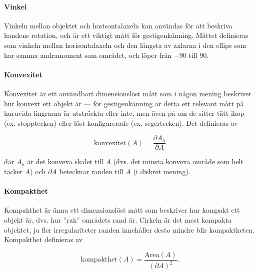 \documentclass[../rapport_MVEX01-11-05]{subfiles}
\begin{document}
\paragraph{Vinkel}
\label{feat:vinkel}

Vinkeln mellan objektet och horisontalaxeln kan användas för att
beskriva handens rotation, och är ett viktigt mått för
gestigenkänning. Måttet definieras som vinkeln mellan horisontalaxeln
och den längsta av axlarna i den ellips som har samma andramoment som
området, och löper från $-90$\textdegree{} till $90$\textdegree{}.




\paragraph{Konvexitet}

Konvexitet \cite[s.~26]{Rudemo09} är ett användbart dimensionslöst
mått som i någon mening beskriver hur konvext ett objekt är --- för
gestigenkänning är detta ett relevant mått på huruvida fingrarna är
utsträckta eller inte, men även på om de sitter tätt ihop (ex.
stopptecken) eller löst konfigurerade (ex. segertecken). Det
definieras av

\begin{equation*}
  \textrm{konvexitet}(A) = \frac{\partial A_h}{\partial A}
\end{equation*}

där $A_h$ är det konvexa skalet till $A$ (dvs. det minsta konvexa område som
helt täcker $A$) och $\partial A$ betecknar randen till $A$ (i diskret
mening).

\paragraph{Kompakthet}

Kompakthet \cite[s.~26]{Rudemo09} är ännu ett dimensionslöst mått som
beskriver hur kompakt ett objekt är, dvs. hur ''rak'' områdets rand
är. Cirkeln är det mest kompakta objektet, ju fler irregulariteter
randen innehåller desto mindre blir kompaktheten. Kompakthet
definieras av

\begin{equation*}
  \textrm{kompakthet}(A) = \frac{\textrm{Area}(A)}{\left(\partial
  A\right)^2}.
\end{equation*}
\end{document}
